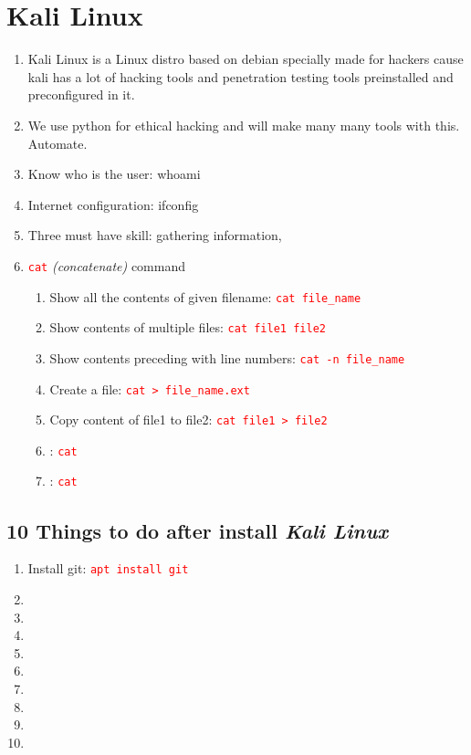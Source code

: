 \documentclass[12 pt, letterpaper]{extarticle}
\newcommand{\R}{\textcolor{red}} %
\newcommand{\T}{\texttt}
\begin{document}
\section*{Kali Linux}
\begin{enumerate}
	\item Kali Linux is a Linux distro based on debian specially made for hackers cause kali has a lot of hacking tools and penetration testing tools preinstalled and preconfigured in it.
	\item We use python for ethical hacking and will make many many tools with this. Automate.
	\item Know who is the user: whoami
	\item Internet configuration: ifconfig
	\item Three must have skill: gathering information, 	
	
	\item \R{\T{cat}} \textit{(concatenate)} command
		\begin{enumerate}
			\item Show all the contents of given  filename: \R{\T{cat file\_name}}
			\item Show contents of multiple files: \R{\T{cat file1 file2}}
			\item Show contents preceding with line numbers: \R{\T{cat -n file\_name}}
			\item Create a file: \R{\T{cat > file\_name.ext}}
			\item Copy content of file1 to file2: \R{\T{cat file1 > file2}}
			\item : \R{\T{cat }}
			\item : \R{\T{cat }}
		\end{enumerate}
\end{enumerate}
\subsection{10 Things to do after install \textit{Kali Linux}}
\begin{enumerate}
	\item Install git: \R{\T{apt install git}}
	\item 
	\item
	\item
	\item
	\item
	\item
	\item
	\item
	\item
\end{enumerate}
\end{document}
